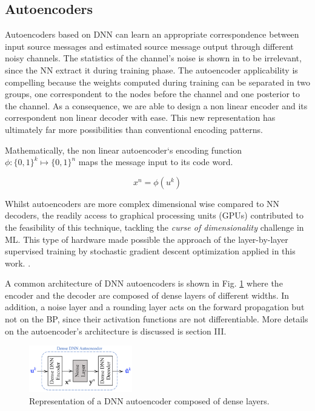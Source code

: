 \documentclass[conference]{IEEEtran}
\begin{document}
\subsection{Autoencoders}

Autoencoders based on DNN can learn an appropriate correspondence between input source messages and estimated source message output through different noisy channels. The statistics of the channel's noise is shown in \cite{2018} to be irrelevant, since the NN extract it during training phase. The autoencoder applicability is compelling because the weights computed during training can be separated in two groups, one correspondent to the nodes before the channel and one posterior to the channel. As a consequence, we are able to design a non linear encoder and its correspondent non linear decoder with ease. This new representation has ultimately far more possibilities than conventional encoding patterns.

Mathematically, the non linear autoencoder`s encoding function $\phi: \{0,1\}^k \mapsto \{0,1\}^n $ maps the message input to its code word. 

\begin{equation}
x^n = \phi (u^k)
\end{equation} 

Whilst autoencoders are more complex dimensional wise compared to NN decoders, the readily access to graphical processing units (GPUs) contributed to the feasibility of this technique, tackling the \textit{curse of dimensionality} challenge in ML. This type of hardware made possible the approach of the layer-by-layer supervised training by stochastic gradient descent optimization applied in this work. \cite{GPU}.

A common architecture of DNN autoencoders is shown in Fig. \ref{fig:DDNNAutoencoder} where the encoder and the decoder are composed of dense layers of different widths. In addition, a noise layer and a rounding layer acts on the forward propagation but not on the BP, since their activation functions are not differentiable. More details on the autoencoder's architecture is discussed is section III.  


\begin{figure}[!ht]
  \centering
    \includegraphics[width=0.4\textwidth]{images/DNN_autoencoder}
    \caption{Representation of a DNN autoencoder composed of dense layers.}\label{fig:DDNNAutoencoder}
\end{figure}
\end{document}
